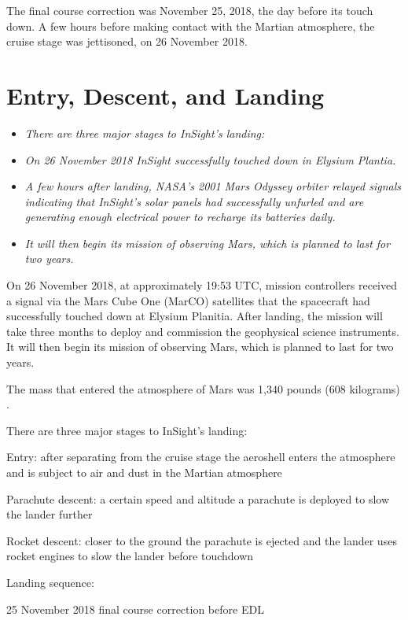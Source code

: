 The final course correction was November 25, 2018, the day before its
touch down. A few hours before making contact with the Martian
atmosphere, the cruise stage was jettisoned, on 26 November 2018.

\section{Entry, Descent, and Landing}\label{entry-descent-and-landing}

\begin{itemize}
\item
  \emph{There are three major stages to InSight's landing:}
\item
  \emph{On 26 November 2018 InSight successfully touched down in Elysium
  Plantia.}
\item
  \emph{A few hours after landing, NASA's 2001 Mars Odyssey orbiter
  relayed signals indicating that InSight's solar panels had
  successfully unfurled and are generating enough electrical power to
  recharge its batteries daily.}
\item
  \emph{It will then begin its mission of observing Mars, which is
  planned to last for two years.}
\end{itemize}

On 26 November 2018, at approximately 19:53 UTC, mission controllers
received a signal via the Mars Cube One (MarCO) satellites that the
spacecraft had successfully touched down at Elysium Planitia. After
landing, the mission will take three months to deploy and commission the
geophysical science instruments. It will then begin its mission of
observing Mars, which is planned to last for two years.

The mass that entered the atmosphere of Mars was 1,340 pounds (608
kilograms) .

There are three major stages to InSight's landing:

Entry: after separating from the cruise stage the aeroshell enters the
atmosphere and is subject to air and dust in the Martian atmosphere

Parachute descent: a certain speed and altitude a parachute is deployed
to slow the lander further

Rocket descent: closer to the ground the parachute is ejected and the
lander uses rocket engines to slow the lander before touchdown

Landing sequence:

25 November 2018 final course correction before EDL

